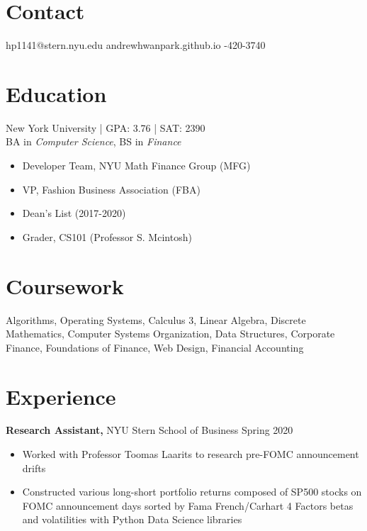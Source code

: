 \documentclass[margin]{res}
\begin{document}
 
 
 
\begin{resume} 
 
\section{Contact} 
hp1141@stern.nyu.edu \quad\quad\quad andrewhwanpark.github.io \quad\quad{}-420-3740

\section{Education} 
New York University | GPA: 3.76 | SAT: 2390 \\
BA in {\it Computer Science}, BS in {\it Finance} 

 \begin{itemize} \itemsep -2pt  %
 \item Developer Team, NYU Math Finance Group (MFG)
 \item VP, Fashion Business Association (FBA)
 \item Dean’s List (2017-2020)
 \item Grader, CS101 (Professor S. Mcintosh)
 \end{itemize}

\section{Coursework}
Algorithms, Operating Systems, Calculus 3, Linear Algebra, Discrete Mathematics, Computer Systems Organization, Data Structures, Corporate Finance, Foundations of Finance, Web Design, Financial Accounting

\section{Experience}
 {\bf Research Assistant,} NYU Stern School of Business \hfill Spring 2020
 \begin{itemize} \itemsep -2pt  %
 \item Worked with Professor Toomas Laarits to research pre-FOMC announcement drifts
 \item Constructed various long-short portfolio returns composed of SP500 stocks on FOMC announcement days sorted by Fama French/Carhart 4 Factors betas and volatilities with Python Data Science libraries 
 \end{itemize}


\end{resume}
\end{document}

